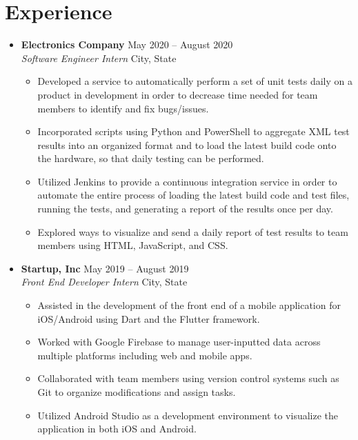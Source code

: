\documentclass[letterpaper,5pt]{article}
\begin{document}
    \section{Experience}
    \begin{itemize}
        \item[]
            \textbf{Electronics Company} \hfill May 2020 -- August 2020 \\
            \textit{Software Engineer Intern} \hfill  City, State  
            \begin{itemize}
                \item[\textbullet] Developed a service to automatically perform a set of unit tests daily on a product in development in order to decrease time needed for team members to identify and fix bugs/issues.
                \item[\textbullet] Incorporated scripts using Python and PowerShell to aggregate XML test results into an organized format and to load the latest build code onto the hardware, so that daily testing can be performed.
                \item[\textbullet] Utilized Jenkins to provide a continuous integration service in order to automate the entire process of loading the latest build code and test files, running the tests, and generating a report of the results once per day.
                \item[\textbullet] Explored ways to visualize and send a daily report of test results to team members using HTML, JavaScript, and CSS.
            \end{itemize}
        \item[]
            \textbf{Startup, Inc} \hfill May 2019 -- August 2019 \\
            \textit{Front End Developer Intern} \hfill City, State
            \begin{itemize}
                \item[\textbullet] Assisted in the development of the front end of a mobile application for iOS/Android using Dart and the Flutter framework.
                \item[\textbullet] Worked with Google Firebase to manage user-inputted data across multiple platforms including web and mobile apps.
                \item[\textbullet] Collaborated with team members using version control systems such as Git to organize modifications and assign tasks.
                \item[\textbullet] Utilized Android Studio as a development environment to visualize the application in both iOS and Android.
            \end{itemize}
    \end{itemize}
\end{document}
